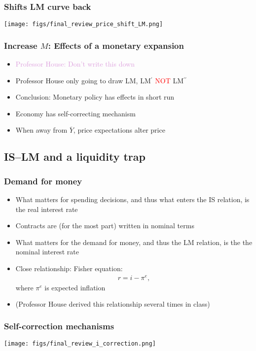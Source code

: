 \documentclass[presentation,dvipsnames]{beamer}
\begin{document}
\begin{frame}
\frametitle{Shifts LM curve back}
\centerline{\texttt{[image: figs/final\_review\_price\_shift\_LM.png]}}
\end{frame}


\begin{frame}
\frametitle{Increase $M$: Effects of a monetary expansion}
\begin{itemize}[label={--}]
\item \textcolor{Plum}{Professor House: Don't write this down}
\item Professor House only going to draw LM, LM$^{\prime}$ \textcolor{red}{NOT} LM$^{\prime\prime}$
\item Conclusion: Monetary policy has effects in short run
\item Economy has self-correcting mechanism
\item When away from $\overline{Y}$, price expectations alter price
\end{itemize}
\end{frame}

\subsection{IS--LM and a liquidity trap}

\begin{frame}
\frametitle{Demand for money}
\begin{itemize}[label={--}]
\item What matters for spending decisions, and thus what enters the IS relation, is the
\textcolor{RubineRed}{real interest rate}
\item Contracts are (for the most part) written in nominal terms
\item What matters for the demand for money, and thus the LM relation, is the
\textcolor{RubineRed}{the nominal interest rate}
\item Close relationship: \textcolor{RubineRed}{Fisher equation}:
\begin{align*}
r = i - \pi^{e},
\end{align*}
where $\pi^{e}$ is expected inflation
\item (Professor House derived this relationship several times in class)
\end{itemize}
\end{frame}

\begin{frame}
\frametitle{Self-correction mechanisms}
\centerline{\texttt{[image: figs/final\_review\_i\_correction.png]}}
\end{frame}
\end{document}
